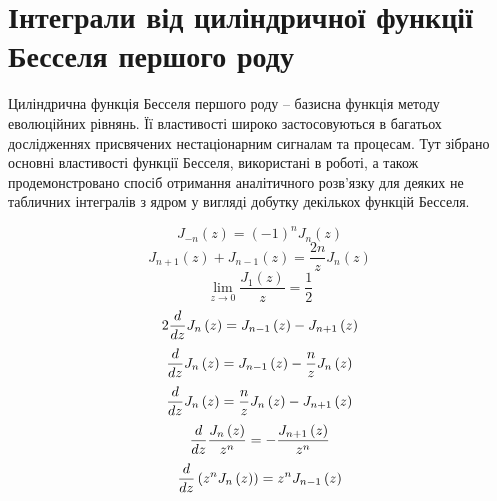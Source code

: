 \chapter{Інтеграли від циліндричної функції Бесселя першого роду}
\label{ch:bessel}

Циліндрична функція Бесселя першого роду -- базисна функція методу еволюційних 
рівнянь. Її властивості широко застосовуються в багатьох дослідженнях присвячених
нестаціонарним сигналам та процесам. Тут зібрано основні властивості 
функції Бесселя, використані в роботі, а також продемонстровано спосіб отримання 
аналітичного розв'язку для деяких не табличних інтегралів з
ядром у вигляді добутку декількох функцій Бесселя.

\begin{equation}
J_{-n} \left( z \right) = \left( -1 \right)^n J_n \left( z \right)
\end{equation}
%
\begin{equation} \label{eq:bessel_order_change}
J_{n+1} \left( z \right) + J_{n-1} \left( z \right) = 
\frac{2n}{z} J_n \left( z \right)
\end{equation}
\begin{equation} \label{eq:limJ1toZ}
\lim_{z \to 0} \left. \frac{J_1 \left( z \right)}{z} \right. = \frac{1}{2}
\end{equation}
\textcolor{blue}{
\begin{equation*}
2 \frac{d }{d z} J_n \left( z \right) = 
J_{n-1} \left( z \right) - J_{n+1} \left( z \right) 
\end{equation*}
%
\begin{equation*}
\frac{d }{d z} J_n \left( z \right) = 
J_{n-1} \left( z \right) - \frac{n}{z} J_{n} \left( z \right) 
\end{equation*}
%
\begin{equation*}
\frac{d }{d z} J_n \left( z \right) = 
\frac{n}{z} J_{n} \left( z \right) - J_{n+1} \left( z \right) 
\end{equation*}
%
\begin{equation*}
\frac{d }{d z} \frac{ J_n \left( z \right) }{ z^n }  = 
- \frac{ J_{n+1} \left( z \right) }{ z^n }
\end{equation*}
%
\begin{equation*}
\frac{d }{d z} \left( z^n J_n \left( z \right) \right)  = 
z^n J_{n-1} \left( z \right)
\end{equation*}
}

